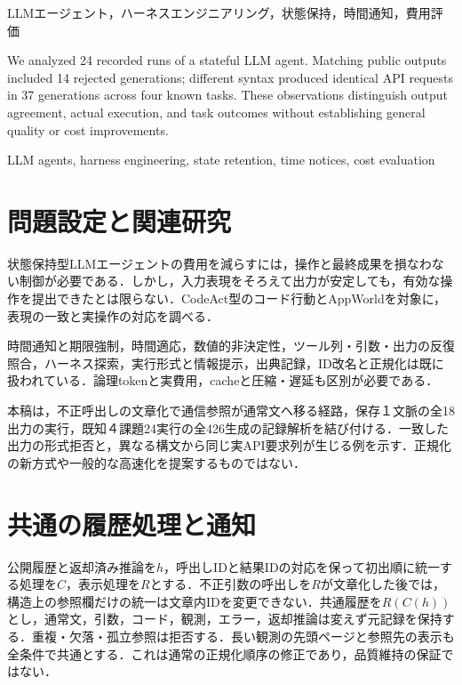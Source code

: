 \documentclass[letter]{ieicej}
\begin{document}
\maketitle
\begin{abstract}
状態保持型LLMエージェントの全24実行を解析した. 同一の公開出力が形式拒否された14生成と，構文が異なっても同じAPI要求列となった４課題37生成を確認した. 表示，実操作，最終成果を区別する必要性を示す.
\end{abstract}
\begin{keyword}LLMエージェント，ハーネスエンジニアリング，状態保持，時間通知，費用評価\end{keyword}
\begin{eabstract}
We analyzed 24 recorded runs of a stateful LLM agent. Matching public outputs included 14 rejected generations; different syntax produced identical API requests in 37 generations across four known tasks. These observations distinguish output agreement, actual execution, and task outcomes without establishing general quality or cost improvements.
\end{eabstract}
\begin{ekeyword}LLM agents, harness engineering, state retention, time notices, cost evaluation\end{ekeyword}
\section{問題設定と関連研究}
状態保持型LLMエージェントの費用を減らすには，操作と最終成果を損なわない制御が必要である．しかし，入力表現をそろえて出力が安定しても，有効な操作を提出できたとは限らない．CodeAct\cite{codeact}型のコード行動とAppWorld\cite{appworld}を対象に，表現の一致と実操作の対応を調べる．

時間通知と期限強制\cite{clock}，時間適応\cite{timely}，数値的非決定性\cite{nondeterminism}，ツール列・引数・出力の反復照合\cite{consistency}，ハーネス探索\cite{beyondprompts}，実行形式\cite{localprotocol}と情報提示\cite{delivery}，出典記録\cite{repro}，ID改名と正規化\cite{canonical}は既に扱われている．論理tokenと実費用\cite{costproxy}，cacheと圧縮・遅延\cite{capc,cacheeval}も区別が必要である．

本稿は，不正呼出しの文章化で通信参照が通常文へ移る経路，保存１文脈の全18出力の実行，既知４課題24実行の全426生成の記録解析を結び付ける．一致した出力の形式拒否と，異なる構文から同じ実API要求列が生じる例を示す．正規化の新方式や一般的な高速化を提案するものではない．

\section{共通の履歴処理と通知}
公開履歴と返却済み推論を$h$，呼出しIDと結果IDの対応を保って初出順に統一する処理を$C$，表示処理を$R$とする．不正引数の呼出しを$R$が文章化した後では，構造上の参照欄だけの統一は文章内IDを変更できない．共通履歴を$R(C(h))$とし，通常文，引数，コード，観測，エラー，返却推論は変えず元記録を保持する．重複・欠落・孤立参照は拒否する．長い観測の先頭ページと参照先の表示も全条件で共通とする．これは通常の正規化順序の修正であり，品質維持の保証ではない．
\end{document}
